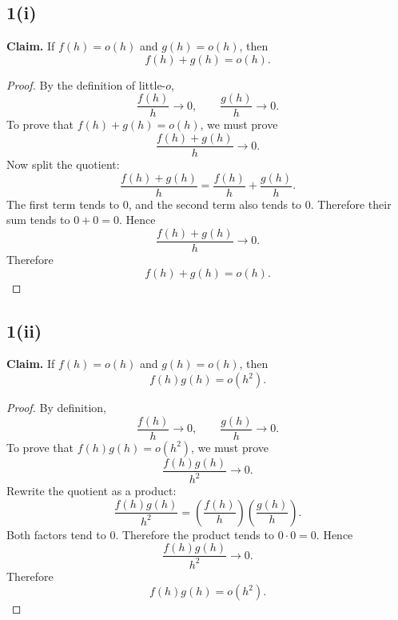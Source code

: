 \documentclass[11pt]{article}
\begin{document}
\begin{center}
\end{center}

\subsection*{1(i)}
\textbf{Claim.} If $f(h)=o(h)$ and $g(h)=o(h)$, then
\[
 f(h)+g(h)=o(h).
\]

\begin{proof}
By the definition of little-$o$,
\[
 \frac{f(h)}{h}\to 0,\qquad \frac{g(h)}{h}\to 0.
\]
To prove that $f(h)+g(h)=o(h)$, we must prove
\[
 \frac{f(h)+g(h)}{h}\to 0.
\]
Now split the quotient:
\[
 \frac{f(h)+g(h)}{h}=\frac{f(h)}{h}+\frac{g(h)}{h}.
\]
The first term tends to $0$, and the second term also tends to $0$.  Therefore their sum tends to $0+0=0$. Hence
\[
 \frac{f(h)+g(h)}{h}\to 0.
\]
Therefore
\[
 \boxed{f(h)+g(h)=o(h).}
\]
\end{proof}

\subsection*{1(ii)}
\textbf{Claim.} If $f(h)=o(h)$ and $g(h)=o(h)$, then
\[
 f(h)g(h)=o(h^2).
\]

\begin{proof}
By definition,
\[
 \frac{f(h)}{h}\to 0,
 \qquad
 \frac{g(h)}{h}\to 0.
\]
To prove that $f(h)g(h)=o(h^2)$, we must prove
\[
 \frac{f(h)g(h)}{h^2}\to 0.
\]
Rewrite the quotient as a product:
\[
 \frac{f(h)g(h)}{h^2}
 =\left(\frac{f(h)}{h}\right)\left(\frac{g(h)}{h}\right).
\]
Both factors tend to $0$.  Therefore the product tends to $0\cdot 0=0$. Hence
\[
 \frac{f(h)g(h)}{h^2}\to 0.
\]
Therefore
\[
 \boxed{f(h)g(h)=o(h^2).}
\]
\end{proof}
\end{document}
